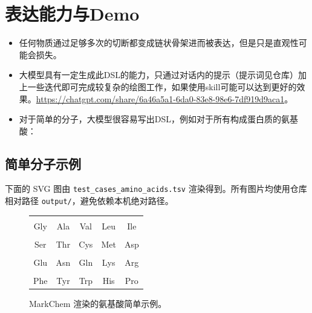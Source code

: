 \documentclass[UTF8,a4paper,11pt]{ctexart}
\begin{document}
\section{表达能力与Demo}
\begin{itemize}


\item 任何物质通过足够多次的切断都变成链状骨架进而被表达，但是只是直观性可能会损失。
\item 大模型具有一定生成此DSL的能力，只通过对话内的提示（提示词见仓库）加上一些迭代即可完成较复杂的绘图工作，如果使用skill可能可以达到更好的效果。\url{https://chatgpt.com/share/6a46a5a1-6da0-83e8-98e6-7df919d9aca1}。
\item 对于简单的分子，大模型很容易写出DSL，例如对于所有构成蛋白质的氨基酸：
\end{itemize}

\subsection{简单分子示例}

下面的 SVG 图由 \verb|test_cases_amino_acids.tsv| 渲染得到。所有图片均使用仓库相对路径 \verb|output/|，避免依赖本机绝对路径。

\begin{figure}[htbp]
\centering
\begin{tabular}{ccccc}
 &
 &
 &
 &
 \\
Gly & Ala & Val & Leu & Ile \\
 &
 &
 &
 &
 \\
Ser & Thr & Cys & Met & Asp \\
 &
 &
 &
 &
 \\
Glu & Asn & Gln & Lys & Arg \\
 &
 &
 &
 &
 \\
Phe & Tyr & Trp & His & Pro \\
\end{tabular}
\caption{MarkChem 渲染的氨基酸简单示例。}
\end{figure}
\end{document}
